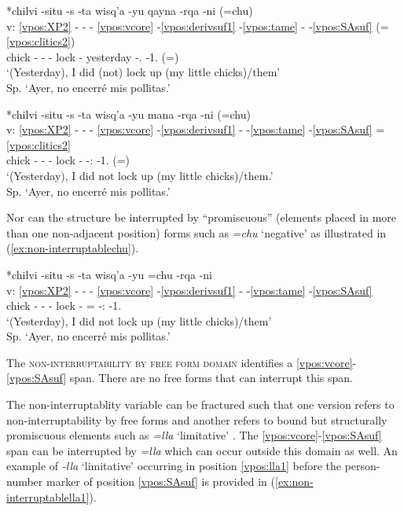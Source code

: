\documentclass[output=paper]{langscibook}
\begin{document}
\ea \label{ex:non-interruptableqayna}{
	\glll {} *chilvi -situ -s -ta  wisq'a -yu qayna -rqa -ni (=chu) \\
        v: \ref{vpos:XP2} - - - \ref{vpos:vcore} -\ref{vpos:derivsuf1} -\ref{vpos:tame} - -\ref{vpos:SAsuf} (=\ref{vpos:clitics2})  \\
        {} chick -\Dim{} -\Poss{} -\Acc{} lock -\Cmpl{} yesterday -\Pst{}.\Rep{} -1.\Sg{} (=\Neg{}) \\
	\glt `(Yesterday), I did (not) lock up (my little chicks)/them' \\ Sp. `Ayer, no encerré mis pollitas.'
	}
\z

\ea \label{ex:non-interruptablemana}{
	\glll {} *chilvi -situ -s -ta wisq'a -yu mana -rqa -ni (=chu) \\
            v: \ref{vpos:XP2} - - - \ref{vpos:vcore} -\ref{vpos:derivsuf1} - -\ref{vpos:tame} -\ref{vpos:SAsuf} =\ref{vpos:clitics2}  \\
            {} chick -\Dim{} -\Poss{} -\Acc{}  lock -\Cmpl{} \Neg{} -\Pst{}:\Rep{} -1.\Sg{} (=\Neg{}) \\
	\glt `(Yesterday), I did not lock up (my little chicks)/them.' \\ Sp. `Ayer, no encerré mis pollitas.'
    }
\z

Nor can the structure be interrupted by ``promiscuous'' (elements placed in more than one non-adjacent position) forms such as \textit{=chu} `negative' as illustrated in (\ref{ex:non-interruptablechu}).

\ea \label{ex:non-interruptablechu}{
	\glll {} *chilvi -situ -s -ta  wisq'a -yu =chu -rqa -ni \\
            v: \ref{vpos:XP2} - - - \ref{vpos:vcore} -\ref{vpos:derivsuf1} - -\ref{vpos:tame} -\ref{vpos:SAsuf}  \\
            {} chick -\Dim{} -\Poss{} -\Acc{} lock -\Cmpl{} =\Neg{} -\Pst{}:\Rep{} -1.\Sg{} \\
	\glt `(Yesterday), I did not lock up (my little chicks)/them' \\ Sp. `Ayer, no encerré mis pollitas.'
	}
\z

The \textsc{non-interruptability by free form domain} identifies a \ref{vpos:vcore}-\ref{vpos:SAsuf} span. There are no free forms that can interrupt this span. 

The non-interruptablity variable can be fractured such that one version refers to non-interruptability by free forms \citep{haspelmathword:2011} and another refers to bound but structurally promiscuous elements such as \textit{=lla} `limitative' \citep{liebercompounds:2017}. The \ref{vpos:vcore}-\ref{vpos:SAsuf} span can be interrupted by \textit{=lla} which can occur outside this domain as well. An example of \textit{-lla} `limitative' occurring in position \ref{vpos:lla1} before the person-number marker of position \ref{vpos:SAsuf} is provided in (\ref{ex:non-interruptablella1}).
\end{document}
